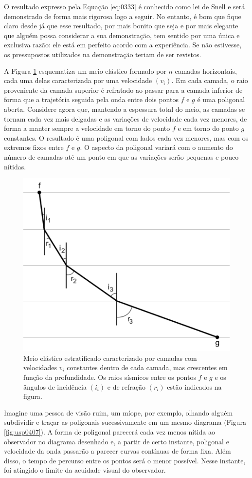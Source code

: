 \documentclass[]{book}
\theoremstyle{definition}
\theoremstyle{definition}
\theoremstyle{definition}
\theoremstyle{remark}
\begin{document}
O resultado expresso pela Equação \eqref{eq:0333} é conhecido como lei de Snell e será demonstrado de forma mais rigorosa logo a seguir. No entanto, é bom que fique claro desde já que esse resultado, por mais bonito que seja e por mais elegante que alguém possa considerar a sua demonstração, tem sentido por uma única e exclusiva razão: ele está em perfeito acordo com a experiência. Se não estivesse, os pressupostos utilizados na demonstração teriam de ser revistos.

A Figura \ref{fig:usp0406} esquematiza um meio elástico formado por \(n\) camadas horizontais, cada uma delas caracterizada por uma velocidade \((v_i)\). Em cada camada, o raio proveniente da camada superior é refratado ao passar para a camada inferior de forma que a trajetória seguida pela onda entre dois pontos \(f\) e \(g\) é uma poligonal aberta. Considere agora que, mantendo a espessura total do meio, as camadas se tornam cada vez mais delgadas e as variações de velocidade cada vez menores, de forma a manter sempre a velocidade em torno do ponto \(f\) e em torno do ponto \(g\) constantes. O resultado é uma poligonal com lados cada vez menores, mas com os extremos fixos entre \(f\) e \(g\). O aspecto da poligonal variará com o aumento do número de camadas até um ponto em que as variações serão pequenas e pouco nítidas.

\begin{figure}

{\centering \includegraphics[width=0.5\linewidth]{fig/figU06} 

}

\caption{Meio elástico estratificado caracterizado por camadas com velocidades $v_i$ constantes dentro de cada camada, mas crescentes em função da profundidade. Os raios sísmicos entre os pontos $f$ e $g$ e os ângulos de incidência $(i_i)$ e de refração $(r_i)$ estão indicados na figura.}\label{fig:usp0406}
\end{figure}

Imagine uma pessoa de visão ruim, um míope, por exemplo, olhando alguém subdividir e traçar as poligonais sucessivamente em um mesmo diagrama (Figura \ref{fig:usp0407}). A forma de poligonal parecerá cada vez menos nítida ao observador no diagrama desenhado e, a partir de certo instante, poligonal e velocidade da onda passarão a parecer curvas contínuas de forma fixa. Além disso, o tempo de percurso entre os pontos será o menor possível. Nesse instante, foi atingido o limite da acuidade visual do observador.
\end{document}

